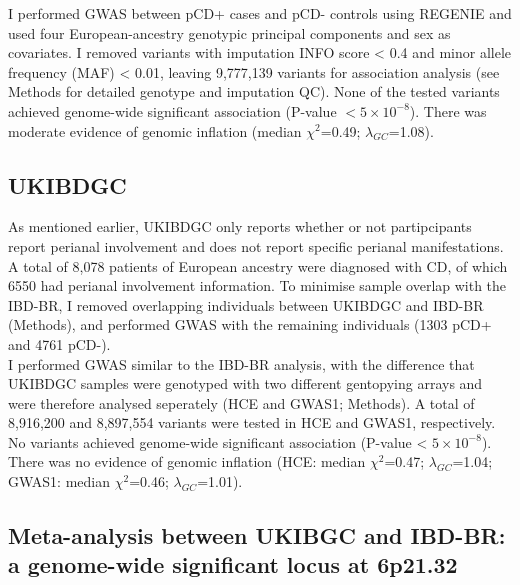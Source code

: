 I performed GWAS between pCD+ cases and pCD- controls using REGENIE and used four European-ancestry genotypic principal components and sex as covariates. I removed variants with imputation INFO score < 0.4 and minor allele frequency (MAF) < 0.01, leaving 9,777,139 variants for association analysis (see Methods for detailed genotype and imputation QC). None of the tested variants achieved genome-wide significant association (P-value $< 5\times10^{-8}$). There was moderate evidence of genomic inflation (median $\chi^{2}$=0.49; $\lambda_{GC}$=1.08).
\subsection{UKIBDGC}
As mentioned earlier, UKIBDGC only reports whether or not partipcipants report perianal involvement and does not report specific perianal manifestations. A total of 8,078 patients of European ancestry were diagnosed with CD, of which 6550 had perianal involvement information. To minimise sample overlap with the IBD-BR, I removed overlapping individuals between UKIBDGC and IBD-BR (Methods), and performed GWAS with the remaining individuals (1303 pCD+ and 4761 pCD-). \\

I performed GWAS similar to the IBD-BR analysis, with the difference that UKIBDGC samples were genotyped with two different gentopying arrays and were therefore analysed seperately (HCE and GWAS1; Methods). A total of 8,916,200 and 8,897,554 variants were tested in HCE and GWAS1, respectively. No variants achieved genome-wide significant association (P-value < $5\times10^{-8}$). There was no evidence of genomic inflation (HCE: median $\chi^{2}$=0.47; $\lambda_{GC}$=1.04; GWAS1: median $\chi^{2}$=0.46; $\lambda_{GC}$=1.01).

\subsection{Meta-analysis between UKIBGC and IBD-BR: a genome-wide significant locus at 6p21.32}

